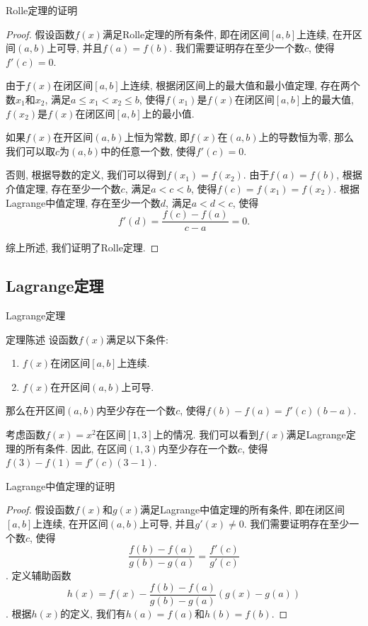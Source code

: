 \documentclass[
10pt,
aspectratio=43,
]{beamer}
\begin{document}
  
\begin{frame}{Rolle定理的证明}
	\begin{proof}
	  假设函数$f(x)$满足Rolle定理的所有条件, 即在闭区间$[a, b]$上连续, 在开区间$(a, b)$上可导, 并且$f(a) = f(b)$. 我们需要证明存在至少一个数$c$, 使得$f'(c) = 0$. \pause
  
	  由于$f(x)$在闭区间$[a, b]$上连续, 根据闭区间上的最大值和最小值定理, 存在两个数$x_1$和$x_2$, 满足$a \leq x_1 < x_2 \leq b$, 使得$f(x_1)$是$f(x)$在闭区间$[a, b]$上的最大值, $f(x_2)$是$f(x)$在闭区间$[a, b]$上的最小值. \pause
  
	  如果$f(x)$在开区间$(a, b)$上恒为常数, 即$f(x)$在$(a, b)$上的导数恒为零, 那么我们可以取$c$为$(a, b)$中的任意一个数, 使得$f'(c) = 0$. \pause
  
	  否则, 根据导数的定义, 我们可以得到$f(x_1) = f(x_2)$. 由于$f(a) = f(b)$, 根据介值定理, 存在至少一个数$c$, 满足$a < c < b$, 使得$f(c) = f(x_1) = f(x_2)$. 根据Lagrange中值定理, 存在至少一个数$d$, 满足$a < d < c$, 使得
	  \[
		f'(d) = \frac{f(c) - f(a)}{c - a} = 0.
		\]
  
	  综上所述, 我们证明了Rolle定理. 
	\end{proof}
  \end{frame}

\subsection{Lagrange定理}
\begin{frame}{Lagrange定理}
	\begin{block}{定理陈述}
	  设函数$f(x)$满足以下条件: 
	  \begin{enumerate}
		\item $f(x)$在闭区间$[a, b]$上连续. 
		\item $f(x)$在开区间$(a, b)$上可导. 
	  \end{enumerate}
	  那么在开区间$(a, b)$内至少存在一个数$c$, 使得$f(b) - f(a) = f'(c)(b - a)$. 
	\end{block}
  
	\pause
  
	\begin{example}
	  考虑函数$f(x) = x^2$在区间$[1, 3]$上的情况. 我们可以看到$f(x)$满足Lagrange定理的所有条件. 因此, 在区间$(1, 3)$内至少存在一个数$c$, 使得$f(3) - f(1) = f'(c)(3 - 1)$. 
	\end{example}
  \end{frame}

  \begin{frame}{Lagrange中值定理的证明}
	\begin{proof}
	  假设函数$f(x)$和$g(x)$满足Lagrange中值定理的所有条件, 即在闭区间$[a, b]$上连续, 在开区间$(a, b)$上可导, 并且$g'(x) \neq 0$. 我们需要证明存在至少一个数$c$, 使得
	  $$\frac{f(b) - f(a)}{g(b) - g(a)} = \frac{f'(c)}{g'(c)}$$. 
  \pause
	  定义辅助函数
	  $$h(x) = f(x) - \frac{f(b) - f(a)}{g(b) - g(a)}(g(x) - g(a))$$. 根据$h(x)$的定义, 我们有$h(a) = f(a)$和$h(b) = f(b)$. 
	\end{proof}
  \end{frame}
\end{document}
